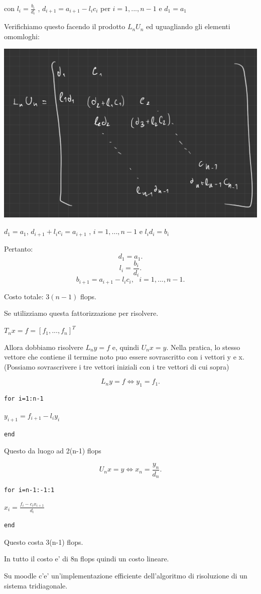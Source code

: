 \documentclass[11pt]{article}
\theoremstyle{definition}
\theoremstyle{plain}
\begin{document}
con $l_i=\frac{b_i}{d_{i}}$ , $d_{i+1}=a_{i+1}-l_{i}c_{i}$  per $i=1,...,n-1$ e $d_1=a_1$ 

Verifichiamo questo facendo il prodotto $L_nU_n$  ed uguagliando gli elementi omomloghi:

\includegraphics[width=\textwidth]{matrice_tn}

$d_1=a_1$, $d_{i+1}+l_{i}c_{i}=a_{i+1}$ , $i=1,...,n-1$ e $l_{i}d_{i}=b_{i}$ 

Pertanto:
\[
d_1=a_1
.\] 
\[
l_{i}=\frac{b_{i}}{d_{i}}
.\] 
\[
b_{i+1}=a_{i+1}-l_{i}c_{i},\ \ \ i=1,...,n-1
.\] 

Costo totale: $3(n-1)$ flops.

Se utilizziamo questa fattorizzazione per risolvere.


$T_nx=f=[f_1,...,f_n]^{T}$ 

Allora dobbiamo risolvere $L_ny=f$ e, quindi $U_nx=y$. Nella pratica, lo stesso vettore che contiene il termine noto puo essere sovrascritto con i vettori y e x.
(Possiamo sovrascrivere i tre vettori iniziali con i tre vettori di cui sopra)

\[
L_ny=f\Leftrightarrow y_1=f_1
.\] 

\begin{lstlisting}
for i=1:n-1
\end{lstlisting}

	$y_{i+1}=f_{i+1}-l_{i}y_{i}$ 

\begin{lstlisting}
end
\end{lstlisting}

Questo da luogo ad 2(n-1) flops

\[
U_nx=y \Leftrightarrow x_n= \frac{y_n}{d_n}
.\] 

\begin{lstlisting}
for i=n-1:-1:1
\end{lstlisting}

	$x_{i}=\frac{f_{i}-c_{i}x_{i+1}}{d_{i}}$ 

\begin{lstlisting}
end
\end{lstlisting}

Questo costa 3(n-1) flops.

In tutto il costo e' di 8n flops quindi un costo lineare.

Su moodle c'e' un'implementazione efficiente dell'algoritmo di risoluzione di un sistema tridiagonale.
\end{document}
